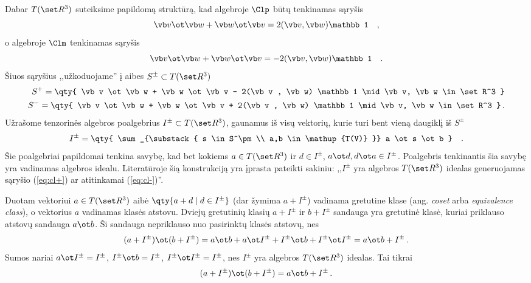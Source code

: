 Dabar $T(\set R^3)$ suteiksime papildomą struktūrą, kad algebroje
$\Clp$ būtų tenkinamas sąryšis
\begin{equation}
	\vb v \ot \vb w
	+
	\vb w \ot \vb v
	=
	2(\vb v , \vb w) \mathbb 1
	\quad ,
	\label{eq:cl+}
\end{equation}
o algebroje $\Clm$ tenkinamas sąryšis
\begin{equation}
	\vb v \ot \vb w
	+
	\vb w \ot \vb v
	=
	- 2(\vb v , \vb w) \mathbb 1
	\quad .
	\label{eq:cl-}
\end{equation}
Šiuos sąryšius ,,užkoduojame'' į aibes $S^\pm \subset T(\set R^3)$
\begin{equation}
	\begin{split}
		S^+ = \qty{
			\vb v \ot \vb w
			+
			\vb w \ot \vb v
			-
			2(\vb v , \vb w) \mathbb 1
			\mid
			\vb v, \vb w \in \set R^3
		}
		\\
		S^- = \qty{
			\vb v \ot \vb w
			+
			\vb w \ot \vb v
			+
			2(\vb v , \vb w) \mathbb 1
			\mid
			\vb v, \vb w \in \set R^3
		}\,.
	\end{split}
\end{equation}
Užrašome tenzorinės algebros poalgebrius $I^\pm \subset T(\set R^3)$,
gaunamus iš visų vektorių, kurie turi bent vieną daugiklį iš $S^\pm$
\begin{equation}
	I^\pm = \qty{
		\sum_{\substack{
			s \in S^\pm \\ 
			a,b \in \mathup{T(V)} 
		}}
		a \ot s \ot b
	}
	\quad .
\end{equation}
Šie poalgebriai papildomai tenkina savybę, kad bet kokiems $a \in T(\set R^3)$
ir $d \in I^\pm$, $a\ot d, d \ot a \in I^\pm$. Poalgebris
tenkinantis šia savybę yra vadinamas algebros idealu.
Literatūroje šią konstrukciją yra įprasta pateikti sakiniu:
,,$I^\pm$ yra algebros $T(\set R^3)$ idealas generuojamas 
sąryšio (\ref{eq:cl+}) ar atitinkamai (\ref{eq:cl-})''.

Duotam vektoriui $a \in T(\set R^3)$ aibė
$\qty{a+d \mid d \in I^\pm}$ (dar žymima $a+I^\pm$)
vadinama gretutine klase (ang. \emph{coset} arba \emph{equivalence class}),
o vektorius $a$ vadinamas klasės atstovu.
Dviejų gretutinių klasių $a+I^\pm$ ir $b + I^\pm$ sandauga yra gretutinė
klasė, kuriai priklauso atstovų sandauga $a \ot b$.
Ši sandauga nepriklauso nuo pasirinktų klasės atstovų, nes
\begin{equation}
	(a+I^\pm)\ot(b+I^\pm)
	=
	a \ot b
	+ a \ot I^\pm
	+ I^\pm \ot b
	+ I^\pm \ot I^\pm
	=
	a \ot b + I^\pm
	\,.
\end{equation}
Sumos nariai 
$a \ot I^\pm = I^\pm $,
$I^\pm \ot b = I^\pm $,
$I^\pm \ot I^\pm = I^\pm $,
nes $I^\pm$ yra algebros $T(\set R^3)$ idealas.
Tai tikrai
\begin{equation}
	(a+I^\pm)\ot(b+I^\pm)
	=
	a \ot b + I^\pm
	\,.
\end{equation}



